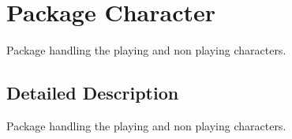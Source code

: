 \hypertarget{namespace_character}{\section{Package Character}
\label{namespace_character}
}


Package handling the playing and non playing characters.  




\subsection{Detailed Description}
Package handling the playing and non playing characters. 